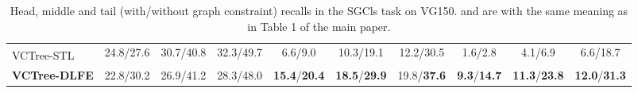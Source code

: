 \documentclass[sigconf]{acmart}
\begin{document}
\begin{table*}[htbp]
{\begin{tabular}{l|c c c|c c c|c c c}
VCTree-STL\textsuperscript{} \cite{chen2019soft} & 24.8/27.6 & 30.7/40.8 & 32.3/49.7 & 6.6/9.0 & 10.3/19.1 & 12.2/30.5 & 1.6/2.8 & 4.1/6.9 & 6.6/18.7 \\
\textbf{VCTree-DLFE} & 22.8/30.2 & 26.9/41.2 & 28.3/48.0 & \textbf{15.4}/\textbf{20.4} & \textbf{18.5}/\textbf{29.9} & 19.8/\textbf{37.6} & \textbf{9.3}/\textbf{14.7} & \textbf{11.3}/\textbf{23.8} & \textbf{12.0}/\textbf{31.3} \\
\hline
\end{tabular}
}
\vspace{0.1em}
\caption{Head, middle and tail (with/without graph constraint) recalls in the SGCls task on VG150.  and  are with the same meaning as in Table 1 of the main paper.
}
\label{tab:head_mid_tail_sgcls}
\end{table*}
\end{document}
